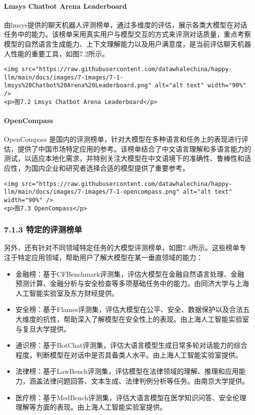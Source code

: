 \documentclass[
]{article}
\begin{document}
\paragraph{Lmsys Chatbot Arena
Leaderboard}\label{lmsys-chatbot-arena-leaderboard}

由lmsys提供的聊天机器人评测榜单，通过多维度的评估，展示各类大模型在对话任务中的能力。该榜单采用真实用户与模型交互的方式来评测对话质量，重点考察模型的自然语言生成能力、上下文理解能力以及用户满意度，是当前评估聊天机器人性能的重要工具，如图7.2所示。

\begin{verbatim}
<img src="https://raw.githubusercontent.com/datawhalechina/happy-llm/main/docs/images/7-images/7-1-lmsys%20Chatbot%20Arena%20Leaderboard.png" alt="alt text" width="90%" />
<p>图7.2 Lmsys Chatbot Arena Leaderboard</p>
\end{verbatim}

\paragraph{OpenCompass}\label{opencompass}

OpenCompass
是国内的评测榜单，针对大模型在多种语言和任务上的表现进行评估，提供了中国市场特定应用的参考。该榜单结合了中文语言理解和多语言能力的测试，以适应本地化需求，并特别关注大模型在中文语境下的准确性、鲁棒性和适应性，为国内企业和研究者选择合适的模型提供了重要参考。

\begin{verbatim}
<img src="https://raw.githubusercontent.com/datawhalechina/happy-llm/main/docs/images/7-images/7-1-opencompass.png" alt="alt text" width="90%" />
<p>图7.3 OpenCompass</p>
\end{verbatim}

\subsubsection{7.1.3
特定的评测榜单}\label{ux7279ux5b9aux7684ux8bc4ux6d4bux699cux5355}

另外，还有针对不同领域特定任务的大模型评测榜单，如图7.4所示。这些榜单专注于特定应用领域，帮助用户了解大模型在某一垂直领域的能力：

\begin{itemize}
\item
  金融榜：基于CFBenchmark评测集，评估大模型在金融自然语言处理、金融预测计算、金融分析与安全检查等多项基础任务中的能力。由同济大学与上海人工智能实验室及东方财经提供。
\item
  安全榜：基于Flames评测集，评估大模型在公平、安全、数据保护以及合法五大维度的抗性，帮助深入了解模型在安全性上的表现。由上海人工智能实验室与复旦大学提供。
\item
  通识榜：基于BotChat评测集，评估大语言模型生成日常多轮对话能力的综合程度，判断模型在对话中是否具备类人水平。由上海人工智能实验室提供。
\item
  法律榜：基于LawBench评测集，评估模型在法律领域的理解、推理和应用能力，涵盖法律问题回答、文本生成、法律判例分析等任务。由南京大学提供。
\item
  医疗榜：基于MedBench评测集，评估大语言模型在医学知识问答、安全伦理理解等方面的表现。由上海人工智能实验室提供。
\end{itemize}
\end{document}
